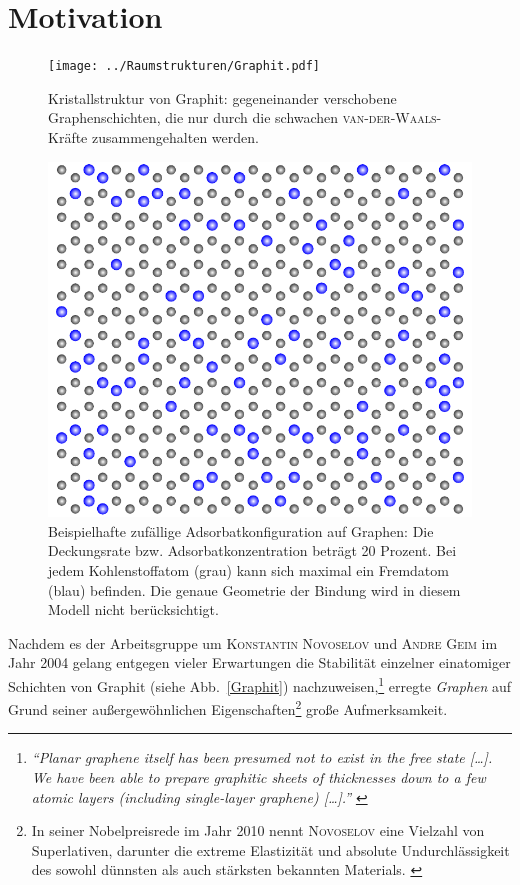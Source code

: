 \documentclass[a4paper, 10pt, twoside, openany]{book} %
\makeatletter
\def \mainmatter {\clearpage \@mainmattertrue \pagenumbering{arabic}}
\makeatother
\begin{document}
	\restoregeometry
	
	\mainmatter
	
	\chapter{Motivation}
	
	\begin{figure}[t]
		\begin{minipage}[b]{0.46\textwidth}
			\texttt{[image: ../Raumstrukturen/Graphit.pdf]}
			\caption[Kristallstruktur von Graphit]{Kristallstruktur von Graphit: gegeneinander verschobene Graphenschichten, die nur durch die schwachen \textsc{van-der-Waals}-Kräfte zusammengehalten werden. \cite{Rozplocha}}
			\label{Graphit}
		\end{minipage}
		\hfill
		\begin{minipage}[b]{0.5\textwidth}
			\includegraphics[width=\textwidth]{Abbildungen/random20.pdf}
			\caption[Beispielhafte zufällige Adsorbatkonfiguration auf Graphen]{Beispielhafte zufällige Adsorbatkonfiguration auf Graphen: Die Deckungsrate bzw. Adsorbatkonzentration beträgt 20 Prozent. Bei jedem Kohlenstoffatom (grau) kann sich maximal ein Fremdatom (blau) befinden. Die genaue Geometrie der Bindung wird in diesem Modell nicht berücksichtigt.}
			\label{random20}
		\end{minipage}
	\end{figure}
	Nachdem es der Arbeitsgruppe um \textsc{Konstantin Novoselov} und \textsc{Andre Geim} im Jahr 2004 gelang entgegen vieler Erwartungen die Stabilität einzelner einatomiger Schichten von Graphit (siehe Abb.~\ref{Graphit}) nachzuweisen,\footnote{\emph{"`Planar graphene itself has been presumed not to exist in the free state \emph{[\dots]}. We have been able to prepare graphitic sheets of thicknesses down to a few atomic layers (including single-layer graphene) \emph{[\dots]}."'} \cite[S.~666f]{Novoselov1}} erregte \emph{Graphen} auf Grund seiner außergewöhnlichen Eigenschaften\footnote{In seiner Nobelpreisrede im Jahr 2010 nennt \textsc{Novoselov} eine Vielzahl von Superlativen, darunter die extreme Elastizität und absolute Undurchlässigkeit des sowohl dünnsten als auch stärksten bekannten Materials. \cite[S.~107]{Novoselov2}} große Aufmerksamkeit.
	
\end{document}
